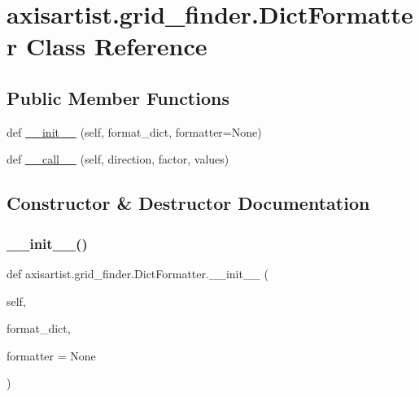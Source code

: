 \hypertarget{classaxisartist_1_1grid__finder_1_1DictFormatter}{}\section{axisartist.\+grid\+\_\+finder.\+Dict\+Formatter Class Reference}
\label{classaxisartist_1_1grid__finder_1_1DictFormatter}
\subsection*{Public Member Functions}
\begin{DoxyCompactItemize}
\item 
def \hyperlink{classaxisartist_1_1grid__finder_1_1DictFormatter_a31b8b73b8d7c8b95727d63e7881adea6}{\+\_\+\+\_\+init\+\_\+\+\_\+} (self, format\+\_\+dict, formatter=None)
\item 
def \hyperlink{classaxisartist_1_1grid__finder_1_1DictFormatter_a68c716f35a9d2707fb1f7424fce51d36}{\+\_\+\+\_\+call\+\_\+\+\_\+} (self, direction, factor, values)
\end{DoxyCompactItemize}


\subsection{Constructor \& Destructor Documentation}
\mbox{\label{classaxisartist_1_1grid__finder_1_1DictFormatter_a31b8b73b8d7c8b95727d63e7881adea6}} 
\subsubsection{\texorpdfstring{\+\_\+\+\_\+init\+\_\+\+\_\+()}{\_\_init\_\_()}}
{\footnotesize\ttfamily def axisartist.\+grid\+\_\+finder.\+Dict\+Formatter.\+\_\+\+\_\+init\+\_\+\+\_\+ (\begin{DoxyParamCaption}\item[{}]{self,  }\item[{}]{format\+\_\+dict,  }\item[{}]{formatter = {\ttfamily None} }\end{DoxyParamCaption})}

